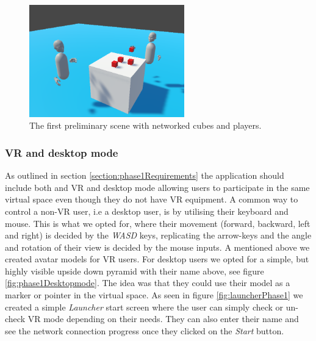 \begin{figure}[]
  \centering
    \captionsetup{width=.6\linewidth}
    \includegraphics[width=0.6\textwidth]{fig/phase_1/networkedScene.PNG}
 \caption{The first preliminary scene with networked cubes and players.}
\label{fig:networkedScene}
\end{figure}

\subsubsection{VR and desktop mode}
As outlined in section \ref{section:phase1Requirements} the application should include both and VR and desktop mode allowing users to participate in the same virtual space even though they do not have VR equipment. A common way to control a non-VR user, i.e a desktop user, is by utilising their keyboard and mouse. This is what we opted for, where their movement (forward, backward, left and right) is decided by the \textit{WASD} keys, replicating the arrow-keys and the angle and rotation of their view is decided by the mouse inputs. A mentioned above we created avatar models for VR users. For desktop users we opted for a simple, but highly visible upside down pyramid with their name above, see figure \ref{fig:phase1Desktopmode}. The idea was that they could use their model as a marker or pointer in the virtual space. 
As seen in figure \ref{fig:launcherPhase1} we created a simple \textit{Launcher} start screen where the user can simply check or un-check VR mode depending on their needs. They can also enter their name and see the network connection progress once they clicked on the \textit{Start} button. 



